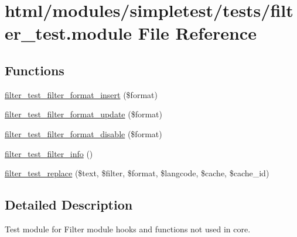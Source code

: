 \hypertarget{filter__test_8module}{
\section{html/modules/simpletest/tests/filter\_\-test.module File Reference}
\label{filter__test_8module}
}
\subsection*{Functions}
\begin{DoxyCompactItemize}
\item 
\hyperlink{filter__test_8module_a4b51ff3af928db3baf3af6b15d57f5b5}{filter\_\-test\_\-filter\_\-format\_\-insert} (\$format)
\item 
\hyperlink{filter__test_8module_a6dcb69319230474dffa899a01bf489ee}{filter\_\-test\_\-filter\_\-format\_\-update} (\$format)
\item 
\hyperlink{filter__test_8module_af572a1498d0293f33d52f8422b7008eb}{filter\_\-test\_\-filter\_\-format\_\-disable} (\$format)
\item 
\hyperlink{filter__test_8module_af4bc201de88d2e5678bfbb2cac1159bf}{filter\_\-test\_\-filter\_\-info} ()
\item 
\hyperlink{filter__test_8module_af8dd6e82b961e96cd06133f1207014ea}{filter\_\-test\_\-replace} (\$text, \$filter, \$format, \$langcode, \$cache, \$cache\_\-id)
\end{DoxyCompactItemize}


\subsection{Detailed Description}
Test module for Filter module hooks and functions not used in core. 

